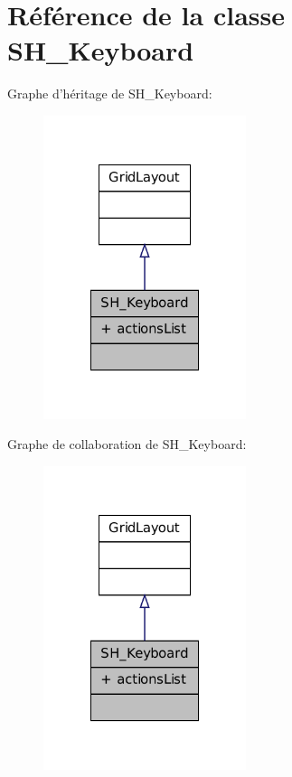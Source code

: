 \hypertarget{classSH__Keyboard}{\section{Référence de la classe S\-H\-\_\-\-Keyboard}
\label{classSH__Keyboard}
}


Graphe d'héritage de S\-H\-\_\-\-Keyboard\-:\nopagebreak
\begin{figure}[H]
\begin{center}
\leavevmode
\includegraphics[width=168pt]{classSH__Keyboard__inherit__graph}
\end{center}
\end{figure}


Graphe de collaboration de S\-H\-\_\-\-Keyboard\-:\nopagebreak
\begin{figure}[H]
\begin{center}
\leavevmode
\includegraphics[width=168pt]{classSH__Keyboard__coll__graph}
\end{center}
\end{figure}

